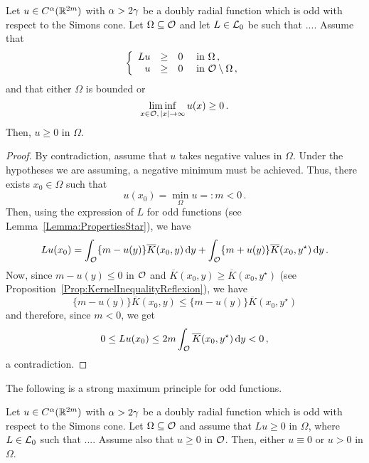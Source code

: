 \begin{proposition}
\label{Prop:WeakMaximumPrincipleForOddFunctionsRotations} Let $u\in C^{\alpha}(\mathbb{R}^{2m})$ with
$\alpha > 2\gamma$ be a doubly radial function which is odd with respect to the Simons cone. Let
$\Omega \subseteq \mathcal{O}$ and let $L \in \mathcal{L}_0$ be such that .... Assume that
$$
\left\{\begin{array}{rcll}
Lu & \geq & 0 & \text{ in } \Omega\,,\\
u & \geq & 0 & \text{ in } \mathcal{O} \setminus \Omega\,,
\end{array} \right.
$$
and that either $\Omega$ is bounded or 
$$
\liminf_{x \in \mathcal{O},\,|x|\to \infty} u(x) \geq 0\,.
$$
Then, $u \geq 0$ in $\Omega$.
\end{proposition}

\begin{proof}
By contradiction, assume that $u$ takes negative values in $\Omega$. Under the hypotheses we are
assuming, a negative minimum must be achieved. Thus, there exists $x_0\in \Omega$ such that
$$
u(x_0) = \min_{\Omega} u =: m < 0\,.
$$
Then, using the expression of $L$ for odd functions (see Lemma~\ref{Lemma:PropertiesStar}), we have
$$
Lu (x_0) = \int_{\mathcal{O}} \{m - u(y) \} \overline{K}(x_0, y) \,\mathrm{d} y +  \int_{\mathcal{O}} \{m + u(y) \} \overline{K}(x_0, y^\star) \,\mathrm{d} y\,.
$$
Now, since $m - u(y) \leq 0$ in $\mathcal{O}$ and $\overline{K}(x_0, y) \geq \overline{K}(x_0, y^\star)$ (see Proposition~\ref{Prop:KernelInequalityReflexion}), we have
$$
\{m - u(y) \} \overline{K}(x_0, y) \leq \{m - u(y) \} \overline{K}(x_0, y^\star)
$$
and therefore, since $m<0$, we get
$$
0 \leq L u(x_0) \leq 2m \int_{\mathcal{O}} \overline{K}(x_0, y^\star) \,\mathrm{d} y < 0\,,
$$
a contradiction.
\end{proof}

The following is a strong maximum principle for odd functions.

\begin{proposition}
\label{Prop:StrongMaximumPrincipleForOddFunctionsRotations} Let $u\in C^{\alpha}(\mathbb{R}^{2m})$ with
$\alpha > 2\gamma$ be a doubly radial function which is odd with respect to the Simons cone.  Let
$\Omega \subseteq \mathcal{O}$ and assume that $Lu \geq 0$ in $\Omega$, where $L \in \mathcal{L}_0$ such that
.... Assume also that $u\geq 0$ in $\mathcal{O}$.
Then, either $u\equiv 0$ or $u > 0$ in $\Omega$.
\end{proposition}

